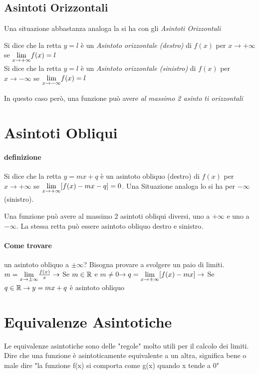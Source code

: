 \documentclass[12pt, a4paper, openany]{book}
\newcommand{\definizione}[1]{\begin{box_definizione} #1 \end{box_definizione}}
\begin{document}
\subsection*{Asintoti Orizzontali}
Una situazione abbastanza analoga la si ha con gli \emph{Asintoti Orizzontali}
\definizione{
    Si dice che la retta $y=l$ è un \emph{Asintoto orizzontale (destro)} di $f(x)$ per $x\to +\infty$ se $\underset{x \to +\infty}{\lim} f(x) = l$
    \\Si dice che la retta $y=l$ è un \emph{Asintoto orizzontale (sinistro)} di $f(x)$ per $x\to -\infty$ se $\underset{x \to -\infty}{\lim} f(x) = l$

}
In questo caso però, una funzione può avere \emph{al massimo 2 asinto   ti orizzontali}

\section{Asintoti Obliqui}
\paragraph*{definizione}{ %
Si dice che la retta $y=mx + q$ è un asintoto obliquo (destro) di $f(x)$ per $x \to +\infty$ se
$\underset{x \to +\infty}{\lim} [f(x)-mx-q]=0$. 
Una Situazione analoga lo si ha per $-\infty $ (sinistro).
}

Una funzione può avere al massimo 2 asintoti obliqui diversi, uno a $+\infty$ e uno a $-\infty$.
La stessa retta può essere asintoto obliquo destro e sinistro.
\paragraph*{Come trovare} un asintoto obliquo a $\pm \infty$? %
Bisogna provare a svolgere un paio di limiti.
\\$m= \underset{x \to \pm \infty}{\lim} \frac{f(x)}{x} \rightarrow$ Se $m\in\mathbb{R}$ e $m\neq 0$$ \rightarrow q=\underset{x \to \pm \infty}{\lim} [f(x)-mx] \rightarrow$ Se $q\in\mathbb{R} \rightarrow y=mx+q$ è asintoto obliquo

\section{Equivalenze Asintotiche}
Le equivalenze asintotiche sono delle "regole" molto utili per il calcolo dei limiti.
Dire che una funzione è asintoticamente equivalente a un altra, significa bene o male dire "la funzione f(x) si comporta come g(x) quando x tende a 0"
\end{document}
